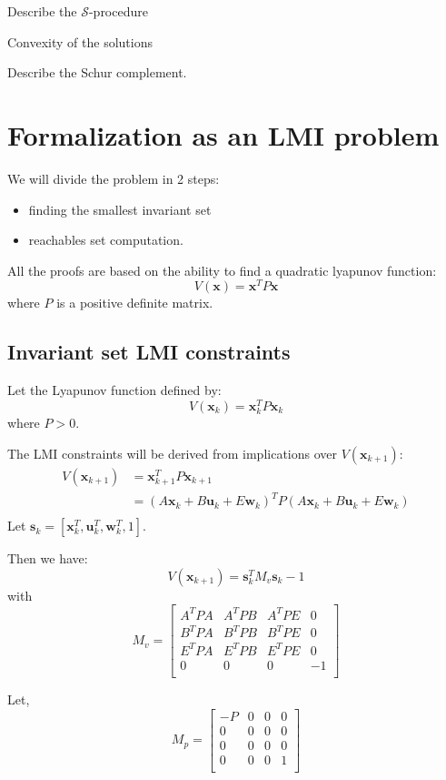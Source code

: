 \documentclass{article}
\theoremstyle{named}
\newcommand{\vect}[1]{\ensuremath{ \mathbf{#1}}}
\newcommand{\Sproc}{$\mathcal{S}$-procedure}
\begin{document}
Describe the \Sproc{} 

Convexity of the solutions

Describe the Schur complement.

\section{Formalization as an LMI problem}
We will divide the problem in 2 steps:
\begin{itemize}
\item finding the smallest invariant set
\item reachables set computation.
\end{itemize}

All the proofs are based on the ability to find a quadratic lyapunov function:
$$
V(\vect{x}) = \vect{x}^T P \vect{x}
$$
where $P$ is a positive definite matrix.

\subsection{Invariant set LMI constraints}
\newcommand{\xk}{\vect{x}_k}
\newcommand{\uk}{\vect{u}_k}
\newcommand{\wk}{\vect{w}_k}
\newcommand{\sk}{\vect{s}_k}
\newcommand{\xkn}{\vect{x}_{k+1}}

Let the Lyapunov function defined by:
$$
V(\xk) = \xk^T P \xk
$$
where $P>0$.

The LMI constraints will be derived from implications over $V(\xkn)$:
\begin{align*}
V(\xkn) &= \xkn^T P \xkn\\
  &= (A \xk + B \uk + E \wk)^T P (A \xk + B \uk + E \wk)\\
\end{align*}
Let $\sk = \left[ \xk^T, \uk^T, \wk^T, 1 \right]$.

Then we have:
$$
V(\xkn) = \sk^T M_v \sk - 1
$$
with
$$
M_v =
\begin{bmatrix}
A^T P A & A^T P B & A^T P E & 0 \\
B^T P A & B^T P B & B^T P E & 0 \\
E^T P A & E^T P B & E^T P E & 0 \\
0       & 0       & 0       & -1 \\
\end{bmatrix}
$$

Let,
$$
M_p = \begin{bmatrix}
-P&0&0&0\\
0 &0&0&0\\
0 &0&0&0\\
0 &0&0&1\\
\end{bmatrix}
$$
\end{document}
